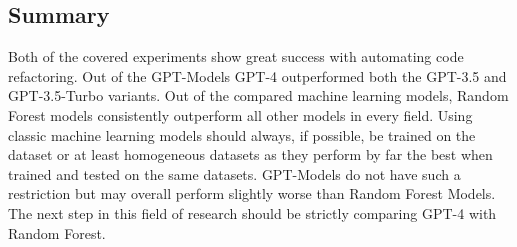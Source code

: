 \subsection{Summary}
Both of the covered experiments show great success with automating code refactoring. Out of the GPT-Models GPT-4 outperformed both the GPT-3.5 and GPT-3.5-Turbo variants. Out of the compared machine learning models, Random Forest models consistently outperform all other models in every field. Using classic machine learning models should always, if possible, be trained on the dataset or at least homogeneous datasets as they perform by far the best when trained and tested on the same datasets. GPT-Models do not have such a restriction but may overall perform slightly worse than Random Forest Models.\\
The next step in this field of research should be strictly comparing GPT-4 with Random Forest.